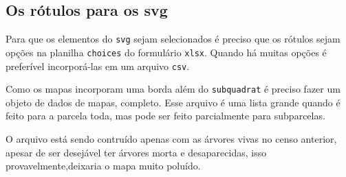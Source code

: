 \documentclass[
  letterpaper,
]{report}
\newenvironment{Shaded}{\begin{snugshade}}{\end{snugshade}}
\newcommand{\AttributeTok}[1]{\textcolor[rgb]{0.40,0.45,0.13}{#1}}
\newcommand{\ConstantTok}[1]{\textcolor[rgb]{0.56,0.35,0.01}{#1}}
\newcommand{\DecValTok}[1]{\textcolor[rgb]{0.68,0.00,0.00}{#1}}
\newcommand{\FunctionTok}[1]{\textcolor[rgb]{0.28,0.35,0.67}{#1}}
\newcommand{\NormalTok}[1]{\textcolor[rgb]{0.00,0.23,0.31}{#1}}
\newcommand{\OtherTok}[1]{\textcolor[rgb]{0.00,0.23,0.31}{#1}}
\newcommand{\SpecialCharTok}[1]{\textcolor[rgb]{0.37,0.37,0.37}{#1}}
\newcommand{\StringTok}[1]{\textcolor[rgb]{0.13,0.47,0.30}{#1}}
\begin{document}
\subsection{Os rótulos para os svg}\label{os-ruxf3tulos-para-os-svg}

Para que os elementos do \texttt{svg} sejam selecionados é preciso que
os rótulos sejam opções na planilha \texttt{choices} do formulário
\texttt{xlsx}. Quando há muitas opções é preferível incorporá-las em um
arquivo \texttt{csv}.

Como os mapas incorporam uma borda além do \texttt{subquadrat} é preciso
fazer um objeto de dados de mapas, completo. Esse arquivo é uma lista
grande quando é feito para a parcela toda, mas pode ser feito
parcialmente para subparcelas.

\begin{tcolorbox}[enhanced jigsaw, arc=.35mm, bottomrule=.15mm, bottomtitle=1mm, breakable, colback=white, colbacktitle=quarto-callout-note-color!10!white, colframe=quarto-callout-note-color-frame, coltitle=black, left=2mm, leftrule=.75mm, opacityback=0, opacitybacktitle=0.6, rightrule=.15mm, title=\textcolor{quarto-callout-note-color}{\faInfo}\hspace{0.5em}{Árvores vivas}, titlerule=0mm, toprule=.15mm, toptitle=1mm]

O arquivo está sendo contruído apenas com as árvores vivas no censo
anterior, apesar de ser desejável ter árvores morta e desaparecidas,
isso provavelmente,deixaria o mapa muito poluído.

\end{tcolorbox}

\begin{Shaded}
\end{Shaded}
\end{document}
